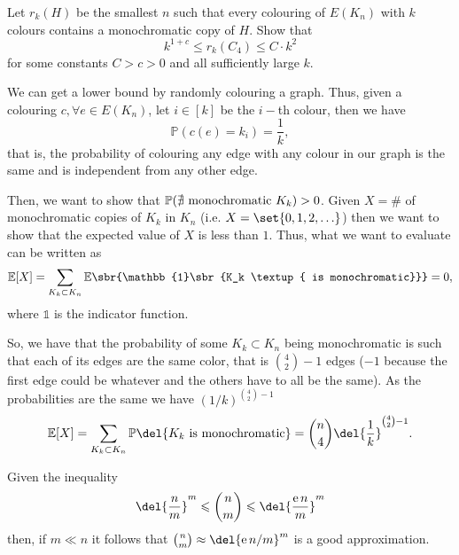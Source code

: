 \documentclass[english]{IMTexam}
\begin{document}
\begin{questions}
\begin{solution}
		\end{solution}
		
		\question Let $ r_k(H) $ be the smallest $ n $ such that every colouring of $ E(K_n) $ with $ k $ colours contains a monochromatic copy of $ H $. Show that
		\[ k^{1+c} \leqslant r_k (C_4) \leqslant C \cdot k^{2} \]
		for some constants $ C > c > 0 $ and all sufficiently large $ k $.
		
		\begin{solution}
			We can get a lower bound by randomly colouring a graph. Thus, given a colouring $ c,\forall e\in E(K_n) $, let $ i\in [k] $ be the $ i- $th colour, then we have
			\[ \mathbb{P}(c(e)=k_i)=\dfrac{1}{k}, \]
			that is, the probability of colouring any edge with any colour in our graph is the same and is independent from any other edge.
			
			Then, we want to show that $ \mathbb{P}(\nexists \textup{ monochromatic }K_k)>0 $. Given $ X= $\# of monochromatic copies of $ K_k $ in $ K_n $ (i.e. $ X=\set{0,1,2,\ldots} $) then we want to show that the expected value of $ X $ is less than $ 1 $. Thus, what we want to evaluate can be written as
			\[ \mathbb{E}[X]=\sum_{K_k\subset K_n}\mathbb{E}\sbr{\mathbb{1}\sbr{K_k \textup{ is monochromatic}}}=0, \]
			where $ \mathbb{1} $ is the indicator function.
			
			So, we have that the probability of some $ K_k\subset K_n $ being monochromatic is such that each of its edges are the same color, that is $ \binom{4}{2}-1 $ edges ($ -1 $ because the first edge could be whatever and the others have to all be the same). As the probabilities are the same we have $ (1/k)^{\binom{4}{2}-1} $
			\[ \mathbb{E}[X]=\sum_{K_k\subset K_n}\mathbb{P}\del{K_k \textup{ is monochromatic}}=\binom{n}{4}\del{\dfrac{1}{k}}^{\binom{4}{2}-1}. \]
			
			Given the inequality \[ \del{\dfrac{n}{m}}^{m}\leqslant\binom{n}{m}\leqslant\del{\dfrac{\mathrm{e}\,n}{m}}^{m} \]
			then, if $ m\ll n $ it follows that $ \binom{n}{m}\approx\del{\mathrm{e}\,n/m}^{m} $ is a good approximation.
			

\end{solution}
\end{questions}
\end{document}
